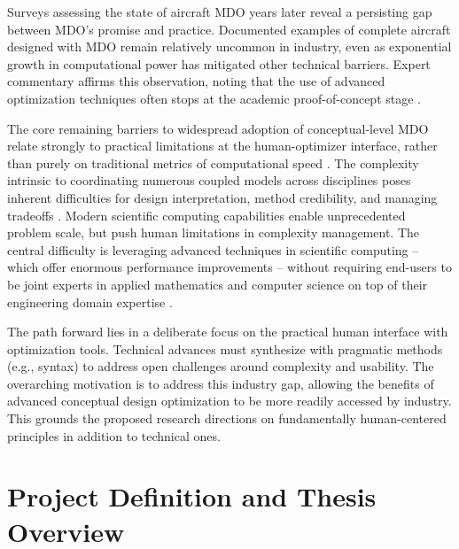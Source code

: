 \documentclass[12pt,vi,oneside,table]{report}
\begin{document}
    Surveys assessing the state of aircraft MDO years later reveal a persisting gap between MDO’s promise and practice. Documented examples of complete aircraft designed with MDO remain relatively uncommon in industry, even as exponential growth in computational power has mitigated other technical barriers. Expert commentary affirms this observation, noting that the use of advanced optimization techniques often stops at the academic proof-of-concept stage \cite{mcmasters_airplane_2002, kroo_multidisciplinary_1997, agte_mdo_2010, ashley_making_1982, haftka_multidisciplinary_1997,gazaix_industrialization_2017}.

    The core remaining barriers to widespread adoption of conceptual-level MDO relate strongly to practical limitations at the human-optimizer interface, rather than purely on traditional metrics of computational speed \cite{gpkit}. The complexity intrinsic to coordinating numerous coupled models across disciplines poses inherent difficulties for design interpretation, method credibility, and managing tradeoffs \cite{salas_framework_1998}. Modern scientific computing capabilities enable unprecedented problem scale, but push human limitations in complexity management. The central difficulty is leveraging advanced techniques in scientific computing -- which offer enormous performance improvements -- without requiring end-users to be joint experts in applied mathematics and computer science on top of their engineering domain expertise \cite{ma_modelingtoolkit_2021}.

    The path forward lies in a deliberate focus on the practical human interface with optimization tools. Technical advances must synthesize with pragmatic methods (e.g., syntax) to address open challenges around complexity and usability. The overarching motivation is to address this industry gap, allowing the benefits of advanced conceptual design optimization to be more readily accessed by industry. This grounds the proposed research directions on fundamentally human-centered principles in addition to technical ones.



    \section{Project Definition and Thesis Overview}
    \label{sec:definition}
\end{document}
